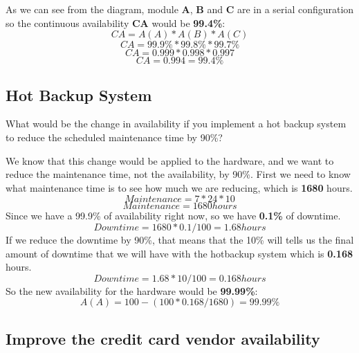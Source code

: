 \noindent
As we can see from the diagram, module \textbf{A}, \textbf{B} and 
\textbf{C} are in a serial configuration so the continuous availability 
\textbf{CA} would be \textbf{99.4\%}:
\[ CA = A(A) * A(B) * A(C) \]
\[ CA =  99.9\% * 99.8\% * 99.7\%\]
\[ CA =  0.999 * 0.998 * 0.997\]
\[CA = 0.994 = 99.4\%\]

\pagebreak

\subsection{Hot Backup System}
What would be the change in availability if you implement a hot backup system 
to reduce the scheduled maintenance time by 90\%? \newline\newline

\noindent
We know that this change would be applied to the hardware, and we want to reduce 
the maintenance time, not the availability, by 90\%. First we need to know 
what maintenance time is to see how much we are reducing, which 
is \textbf{1680} hours.
\[ Maintenance = 7 * 24 * 10 \]
\[ Maintenance = 1680 hours \]
Since we have a 99.9\% of availability right now, so we have \textbf{0.1\%} of
downtime. 
\[ Downtime = 1680 * 0.1 / 100 = 1.68 hours \]
If we reduce the downtime by 90\%, that means that the 10\% will tells us the 
final amount of downtime that we will have with the hotbackup system which is 
\textbf{0.168} hours.
\[ Downtime = 1.68 * 10 / 100 = 0.168 hours \]
So the new availability for the hardware would be \textbf{99.99\%}: 
\[ A(A) = 100 - (100 * 0.168 / 1680) = 99.99\% \]

\pagebreak

\subsection{Improve the credit card vendor availability}
